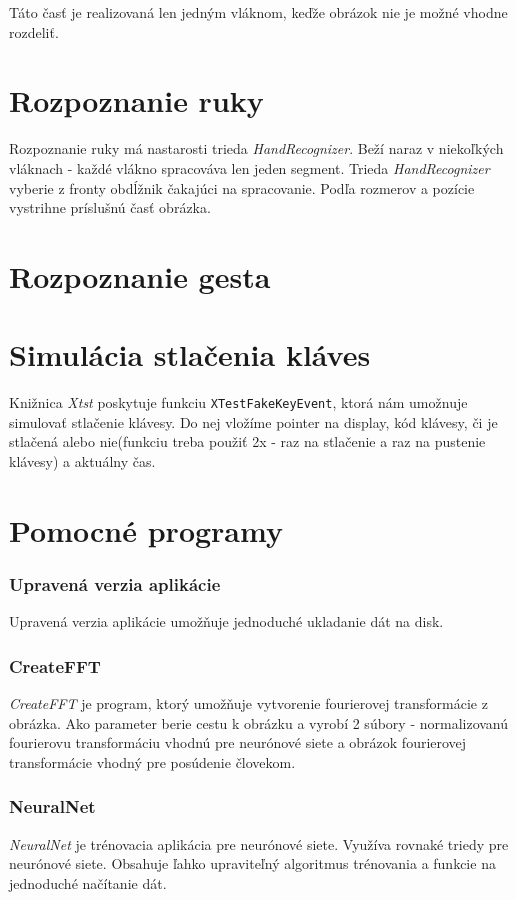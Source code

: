 Táto časť je realizovaná len jedným vláknom, keďže obrázok nie je možné vhodne rozdeliť.

\section{Rozpoznanie ruky}

Rozpoznanie ruky má nastarosti trieda \textit{HandRecognizer}. Beží naraz v niekoľkých vláknach - každé vlákno spracováva len jeden segment.
Trieda \textit{HandRecognizer} vyberie z fronty obdĺžnik čakajúci na spracovanie. Podľa rozmerov a pozície vystrihne príslušnú časť obrázka.


\section{Rozpoznanie gesta}


\section{Simulácia stlačenia kláves}
Knižnica \textit{Xtst} poskytuje funkciu {\tt XTestFakeKeyEvent}, ktorá nám umožnuje simulovať stlačenie klávesy. Do nej vložíme pointer na display, kód klávesy, či je stlačená alebo nie(funkciu treba použiť 2x - raz na stlačenie a raz na pustenie klávesy) a aktuálny čas.

\section{Pomocné programy}

\subsubsection{Upravená verzia aplikácie}
Upravená verzia aplikácie umožňuje jednoduché ukladanie dát na disk.

\subsubsection{CreateFFT}

\textit{CreateFFT} je program, ktorý umožňuje vytvorenie fourierovej transformácie z obrázka. Ako parameter berie cestu k obrázku a vyrobí 2 súbory - normalizovanú fourierovu transformáciu vhodnú pre neurónové siete a obrázok fourierovej transformácie vhodný pre posúdenie človekom.

\subsubsection{NeuralNet}
\textit{NeuralNet} je trénovacia aplikácia pre neurónové siete. Využíva rovnaké triedy pre neurónové siete. Obsahuje ľahko upraviteľný algoritmus trénovania a funkcie na jednoduché načítanie dát. 

